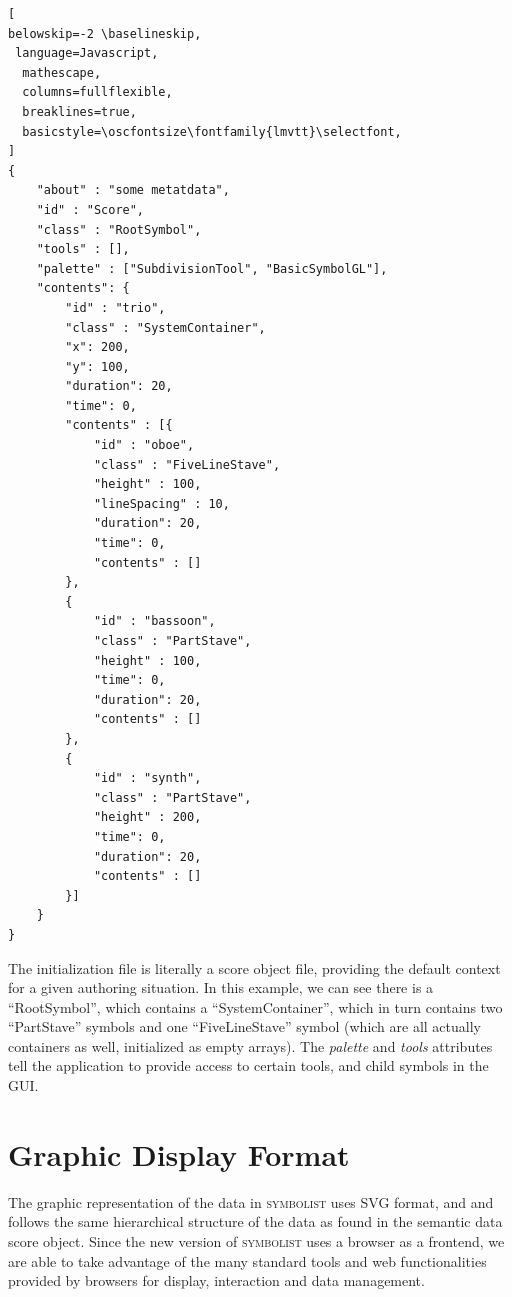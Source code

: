 \documentclass{article}
\def\symbolist{\textsc{symbolist}\xspace}
\def\oscfontsize{\tiny}
\begin{document}
\begin{minipage}{\linewidth}
\begin{lstlisting}[
belowskip=-2 \baselineskip,
 language=Javascript,
  mathescape,
  columns=fullflexible,
  breaklines=true,
  basicstyle=\oscfontsize\fontfamily{lmvtt}\selectfont,
]
{
    "about" : "some metatdata",
    "id" : "Score",
    "class" : "RootSymbol",
    "tools" : [],
    "palette" : ["SubdivisionTool", "BasicSymbolGL"],
    "contents": { 
        "id" : "trio",
        "class" : "SystemContainer",
        "x": 200,
        "y": 100,
        "duration": 20,
        "time": 0,
        "contents" : [{
            "id" : "oboe",
            "class" : "FiveLineStave",
            "height" : 100,
            "lineSpacing" : 10,
            "duration": 20,
            "time": 0,
            "contents" : []
        },
        {
            "id" : "bassoon",
            "class" : "PartStave",
            "height" : 100,
            "time": 0,
            "duration": 20,
            "contents" : []
        },
        {
            "id" : "synth",
            "class" : "PartStave",
            "height" : 200,
            "time": 0,
            "duration": 20,
            "contents" : []
        }]
    }
}
\end{lstlisting}
\end{minipage}

The initialization file is literally a score object file, providing the default context for a given authoring situation. In this example, we can see there is a ``RootSymbol'', which contains a ``SystemContainer'', which in turn contains two ``PartStave'' symbols and one ``FiveLineStave'' symbol (which are all actually containers as well, initialized as empty arrays). The \textit{palette} and \textit{tools} attributes tell the application to provide access to certain tools, and child symbols in the GUI.

\section{Graphic Display Format}\label{graphic_display_format}

The graphic representation of the data in \symbolist uses SVG format, and and follows the same hierarchical structure of the data as found in the semantic data score object.
Since the new version of \symbolist uses a browser as a frontend, we are able to take advantage of the many standard tools and web functionalities provided by browsers for display, interaction and data management.
\end{document}

